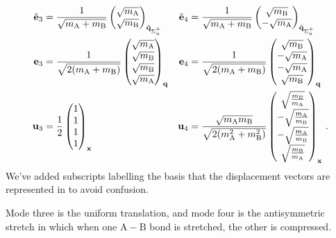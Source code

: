 \documentclass{article}
\theoremstyle{plain}\theoremheaderfont{\normalfont\itshape}\theorembodyfont{\rmfamily}\theoremseparator{.}\newtheorem*{rem}{Remark}\newtheorem*{ex}{Example}\newtheorem*{proof}{Proof}\newtheorem*{altp}{Alternative proof}
\theoremstyle{plain}\theoremheaderfont{\normalfont\bfseries}\theorembodyfont{\rmfamily}\theoremseparator{.}\newtheorem{thm}{Theorem}[section]\newtheorem{lem}[thm]{Lemma}\newtheorem{prop}[thm]{Proposition}\newtheorem*{cor}{Corollary}\newtheorem{defn}[thm]{Definition}\newtheorem{clm}[thm]{Claim}\newtheorem{clminproof}{Claim}
\theoremstyle{break}\theoremheaderfont{\normalfont\itshape}\theorembodyfont{\rmfamily}\theoremseparator{.\medskip}\newtheorem*{proofskip}{Proof}\newtheorem*{exs}{Examples}\newtheorem*{rems}{Remarks}
\theoremstyle{break}\theoremheaderfont{\normalfont\bfseries}\theorembodyfont{\rmfamily}\theoremseparator{.\medskip}\newtheorem{lemskip}[thm]{Lemma}\newtheorem{defnskip}[thm]{Definition}\newtheorem{propskip}[thm]{Proposition}\newtheorem{thmskip}[thm]{Theorem}
\numberwithin{equation}{section}
\newcommand{\vb}[1]{\bm{\mathrm{#1}}}
\renewcommand{\AA}{\mathrm{A}}
\newcommand{\BB}{\mathrm{B}}
\begin{document}
    \begin{align}
        \tilde{\vb{e}}_3&=\frac{1}{\sqrt{m_{\AA}+m_{\BB}}}\begin{pmatrix}
            \sqrt{m_{\AA}} \\ \sqrt{m_{\BB}}
        \end{pmatrix}_{\tilde{\vb{q}}_{\Sigma_u^+}} & \tilde{\vb{e}}_4&=\frac{1}{\sqrt{m_{\AA}+m_{\BB}}}\begin{pmatrix}
            \sqrt{m_{\BB}} \\ -\sqrt{m_{\AA}}
        \end{pmatrix}_{\tilde{\vb{q}}_{\Sigma_u^+}} \notag\\
        \vb{e}_3&=\frac{1}{\sqrt{2(m_{\AA}+m_{\BB})}}\begin{pmatrix}
            \sqrt{m_{\AA}} \\ \sqrt{m_{\BB}} \\ \sqrt{m_{\BB}} \\ \sqrt{m_{\AA}}
        \end{pmatrix}_{\vb{q}} & \vb{e}_4&=\frac{1}{\sqrt{2(m_{\AA}+m_{\BB})}}\begin{pmatrix}
            \sqrt{m_{\BB}} \\ -\sqrt{m_{\AA}} \\ -\sqrt{m_{\AA}} \\ \sqrt{m_{\BB}}
        \end{pmatrix}_{\vb{q}} \notag\\
        \vb{u}_3&=\frac{1}{2}\begin{pmatrix}
            1 \\ 1 \\ 1 \\ 1
        \end{pmatrix}_{\vb{x}} & \vb{u}_4&=\frac{\sqrt{m_{\AA}m_{\BB}}}{\sqrt{2(m_{\AA}^2+m_{\BB}^2)}}\begin{pmatrix}
            \sqrt{\frac{m_{\BB}}{m_{\AA}}} \\ -\sqrt{\frac{m_{\AA}}{m_{\BB}}} \\ -\sqrt{\frac{m_{\AA}}{m_{\BB}}} \\ \sqrt{\frac{m_{\BB}}{m_{\AA}}}
        \end{pmatrix}_{\vb{x}}\,.
    \end{align}
    We've added subscripts labelling the basis that the displacement vectors are represented in to avoid confusion.

    Mode three is the uniform translation, and mode four is the antisymmetric stretch in which when one \(\mathrm{A-B}\) bond is stretched, the other is compressed.
\end{document}
